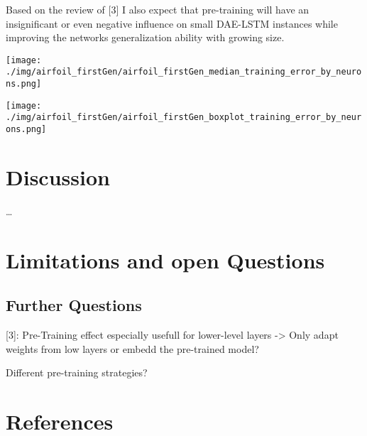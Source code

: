 \documentclass[
  11pt,
]{article}
\let\origfigure\figure
\let\endorigfigure\endfigure
\renewenvironment{figure}[1][2] {
    \expandafter\origfigure\expandafter[H]
} {
    \endorigfigure
}
\begin{document}
Based on the review of {[}3{]} I also expect that pre-training will have an insignificant or even negative influence on small DAE-LSTM instances while improving the networks generalization ability with growing size.

\begin{figure}
\centering
\texttt{[image: ./img/airfoil\_firstGen/airfoil\_firstGen\_median\_training\_error\_by\_neurons.png]}
\caption{Airfoil - First Generation Median Training Error for variable number of hidden Neurons}
\end{figure}

\begin{figure}
\centering
\texttt{[image: ./img/airfoil\_firstGen/airfoil\_firstGen\_boxplot\_training\_error\_by\_neurons.png]}
\caption{Airfoil - First Generation final Training Error for variable number of hidden Neurons}
\end{figure}

\hypertarget{discussion}{%
\section{Discussion}\label{discussion}}

\ldots{}

\hypertarget{limitations-and-open-questions}{%
\section{Limitations and open Questions}\label{limitations-and-open-questions}}

\hypertarget{further-questions}{%
\subsection{Further Questions}\label{further-questions}}

{[}3{]}: Pre-Training effect especially usefull for lower-level layers -\textgreater{} Only adapt weights from low layers or embedd the pre-trained model?

Different pre-training strategies?

\newpage

\hypertarget{I}{%
\section*{References}\label{I}}
\end{document}
